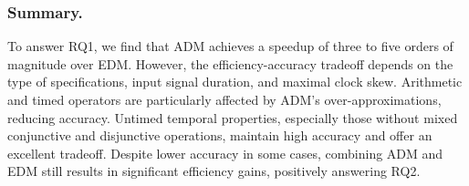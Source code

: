 \vspace{-0.5em}
\subsubsection{Summary.}
To answer RQ1, we find that ADM achieves a speedup of three to five orders of magnitude over EDM. However, the efficiency-accuracy tradeoff depends on the type of specifications, input signal duration, and maximal clock skew. Arithmetic and timed operators are particularly affected by ADM's over-approximations, reducing accuracy. Untimed temporal properties, especially those without mixed conjunctive and disjunctive operations, maintain high accuracy and offer an excellent tradeoff. Despite lower accuracy in some cases, combining ADM and EDM still results in significant efficiency gains, positively answering RQ2.

